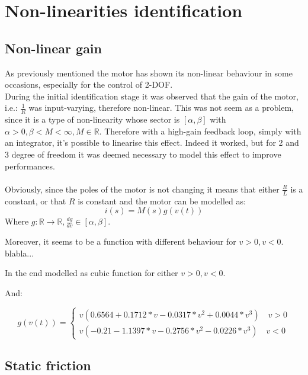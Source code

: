 \chapter{Non-linearities identification}

\section{Non-linear gain}
As previously mentioned the motor has shown its non-linear behaviour in some occasions, especially for the control of 2-DOF. \\
During the initial identification stage it was observed that the gain of the motor, i.e.: $\frac{1}{R}$ was input-varying, therefore non-linear. This was not seem as a problem, since it is a type of non-linearity whose sector is $[\alpha, \beta]$ with $\alpha > 0, \beta <M < \infty, M \in \mathbb{R}$. Therefore with a high-gain feedback loop, simply with an integrator, it's possible to linearise this effect. Indeed it worked, but for 2 and 3 degree of freedom it was deemed necessary to model this effect to improve performances.\\ \\
Obviously, since the poles of the motor is not changing  it means that either $\frac{R}{L}$ is a constant, or that $R$ is constant and the motor can be modelled as:
\begin{equation}
i(s)=M(s)g(v(t))
\end{equation}
Where $g: \mathbb{R} \to \mathbb{R}, \frac{dg}{dv} \in [\alpha, \beta]$.

Moreover, it seems to be a function with different behaviour for $v>0,v<0$. blabla...

In the end modelled as cubic function for either $v>0,v<0$.

And:

\begin{equation}
g(v(t)) = \begin{cases}
v(0.6564+0.1712*v-0.0317*v^2+0.0044*v^3) \quad v>0 \\
v(-0.21-1.1397*v-0.2756*v^2-0.0226*v^3) \quad v< 0
\end{cases}
\end{equation}
\section{Static friction}
